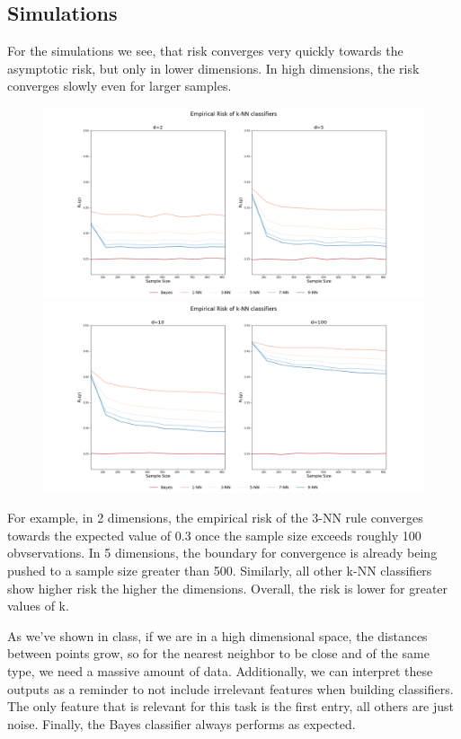 \documentclass[a4paper, 11pt]{article} %
\begin{document}
\newpage
\subsection*{Simulations}

For the simulations we see, that risk converges very quickly towards the asymptotic risk, but only in lower dimensions. In high dimensions, the risk converges slowly even for larger samples.

\begin{figure}[H]
\centering
\includegraphics[scale= 0.3]{Emp_Risk_d_2_5}
\includegraphics[scale= 0.3]{Emp_Risk_d_10_100}
\end{figure}

For example, in 2 dimensions, the empirical risk of the 3-NN rule converges towards the expected value of 0.3 once the sample size exceeds roughly 100 obvservations. In 5 dimensions, the boundary for convergence is already being pushed to a sample size greater than 500. Similarly, all other k-NN classifiers show higher risk the higher the dimensions. Overall, the risk is lower for greater values of k.

As we've shown in class, if we are in a high dimensional space, the distances between points grow, so for the nearest neighbor to be close and of the same type, we need a massive amount of data. Additionally, we can interpret these outputs as a reminder to not include irrelevant features when building classifiers. The only feature that is relevant for this task is the first entry, all others are just noise. Finally, the Bayes classifier always performs as expected. \\
\end{document}
